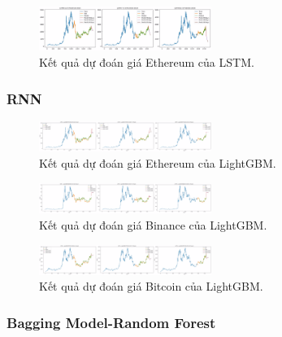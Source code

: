 \documentclass[conference]{IEEEtran}
\begin{document}
\begin{figure}[H]
    \centering
    \includegraphics[width=0.5\textwidth]{bibliography/pictures/LSTM ETH.jpg}
    \caption{Kết quả dự đoán giá Ethereum của LSTM.}
\end{figure}



\subsubsection{RNN}

\begin{figure}[H]
    \centering
    \includegraphics[width=0.5\textwidth]{bibliography/pictures/ETH LightGBM.jpg}
    \caption{Kết quả dự đoán giá Ethereum của LightGBM.}
\end{figure}
\begin{figure}[H]
    \centering
    \includegraphics[width=0.5\textwidth]{bibliography/pictures/BNB LightGBM.jpg}
    \caption{Kết quả dự đoán giá Binance của LightGBM.}
\end{figure}
\begin{figure}[H]
    \centering
    \includegraphics[width=0.5\textwidth]{bibliography/pictures/BTC LightGBM.jpg}
    \caption{Kết quả dự đoán giá Bitcoin của LightGBM.}
\end{figure}


\subsubsection{Bagging Model-Random Forest}
\end{document}
